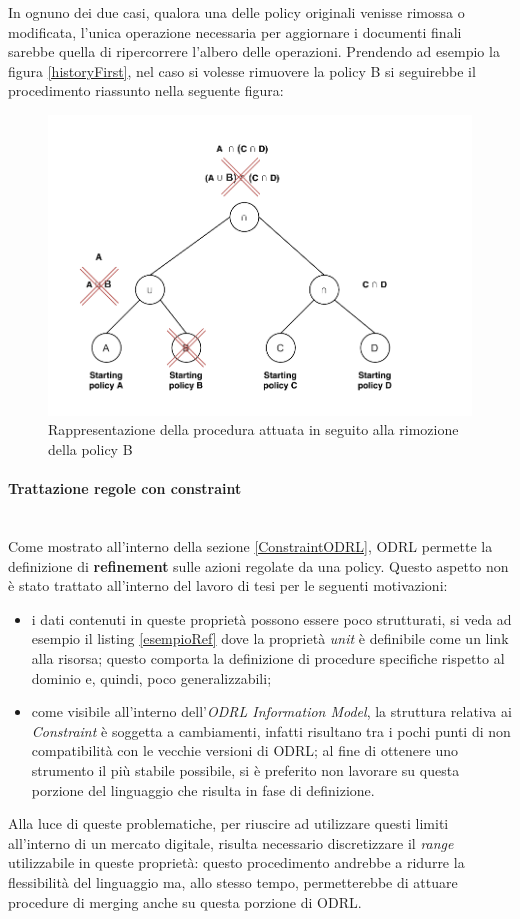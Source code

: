 \documentclass[12pt,a4paper,twoside]{book}
\begin{document}
In ognuno dei due casi, qualora una delle policy originali venisse rimossa o modificata, l'unica operazione necessaria per aggiornare i documenti finali sarebbe quella di ripercorrere l'albero delle operazioni. Prendendo ad esempio la figura \ref{historyFirst}, nel caso si volesse rimuovere la policy B si seguirebbe il procedimento riassunto nella seguente figura:
\begin{figure}[H]
\centering
\includegraphics[scale=.80]{../immagini/historySecond.pdf}
\caption{Rappresentazione della procedura attuata in seguito alla rimozione della policy B}
\label{historySecond}
\end{figure}
\paragraph{Trattazione regole con constraint}\mbox{}\\
Come mostrato all'interno della sezione \ref{ConstraintODRL}, ODRL permette la definizione di \textbf{refinement} sulle azioni regolate da una policy. Questo aspetto non è stato trattato all'interno del lavoro di tesi per le seguenti motivazioni:
\begin{itemize}
\item i dati contenuti in queste proprietà possono essere poco strutturati, si veda ad esempio il listing \ref{esempioRef} dove la proprietà \textit{unit} è definibile come un link alla risorsa; questo comporta la definizione di procedure specifiche rispetto al dominio e, quindi, poco generalizzabili;
\item come visibile all'interno dell'\textit{ODRL Information Model}\cite{ODRLinfMod}, la struttura relativa ai \textit{Constraint} è soggetta a cambiamenti, infatti risultano tra i pochi punti di non compatibilità con le vecchie versioni di ODRL; al fine di ottenere uno strumento il più stabile possibile, si è preferito non lavorare su questa porzione del linguaggio che risulta in fase di definizione. 
\end{itemize}
Alla luce di queste problematiche, per riuscire ad utilizzare questi limiti all'interno di un mercato digitale, risulta necessario discretizzare il \textit{range} utilizzabile in queste proprietà: questo procedimento andrebbe a ridurre la flessibilità del linguaggio ma, allo stesso tempo, permetterebbe di attuare procedure di merging anche su questa porzione di ODRL.  
\end{document}
